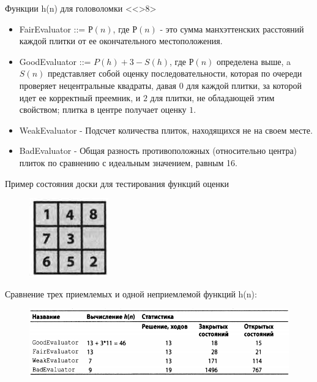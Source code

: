 \documentclass{beamer}
\begin{document}
\begin{frame}{Функции h(n) для головоломки <<>8>}
\begin{itemize}
\item FairEvaluator ::= $Р(n)$, где $Р(n)$ - это сумма манхэттенских расстояний каждой плитки от ее окончательного местоположения.
\item GoodEvaluator ::= $P(h)+3-S(h)$, где $Р(n)$ определена выше, a $S(n)$ представляет собой оценку последовательности, которая по очереди проверяет нецентральные квадраты, давая $0$ для каждой плитки, за которой идет ее корректный преемник, и $2$ для плитки, не обладающей этим свойством; плитка в центре получает оценку $1$.
\item WeakEvaluator - Подсчет количества плиток, находящихся не на своем месте.
\item BadEvaluator - Общая разность противоположных (относительно центра) плиток по сравнению с идеальным значением, равным 16.
\end{itemize}
\end{frame}

\begin{frame}
Пример состояния доски для тестирования функций оценки
\begin{figure}[h]
\centering
\includegraphics[scale=0.5]{images/lec06-pic13.png}
\end{figure}
Сравнение трех приемлемых и одной неприемлемой функций h(n):
\begin{figure}[h]
\centering
\includegraphics[scale=0.6]{images/lec06-pic14.png}
\end{figure}
\end{frame}
\end{document}
